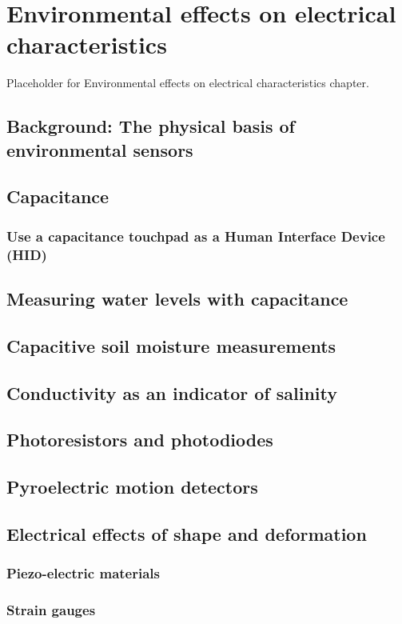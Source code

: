 \setchapterpreamble[u]{\margintoc}
\chapter{\color{gray} Environmental effects on electrical characteristics \color{black}}

Placeholder for Environmental effects on electrical characteristics chapter.

\section{\color{gray} Background: The physical basis of environmental sensors \color{black}}

\section{\color{gray} Capacitance \color{black}}

\subsection{\color{gray} Use a capacitance touchpad as a Human Interface Device (HID) \color{black}}
\section{\color{gray} Measuring water levels with capacitance \color{black}}
\section{\color{gray} Capacitive soil moisture measurements \color{black}}

\section{\color{gray} Conductivity as an indicator of salinity \color{black}}

\section{\color{gray} Photoresistors and photodiodes \color{black}}

\section{\color{gray} Pyroelectric motion detectors \color{black}}

\section{\color{gray} Electrical effects of shape and deformation \color{black}}

\subsection{\color{gray} Piezo-electric materials \color{black}}

\subsection{\color{gray} Strain gauges \color{black}}

